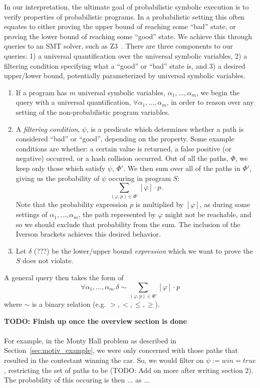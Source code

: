 \documentclass[acmsmall,review]{acmart}\settopmatter{}
\begin{document}
	
	In our interpretation, the ultimate goal of probabilistic symbolic execution is to verify properties of probabilistic programs.
	In a probabilistic setting this often equates to either proving the upper bound of reaching some ``bad'' state, or proving the lower bound of reaching some ``good'' state.
	We achieve this through queries to an SMT solver, such as Z3~\cite{demoura2008}.
	There are three components to our queries: 1) a universal quantification over the universal symbolic variables, 2) a filtering condition specifying what a ``good'' or ``bad'' state is, and 3) a desired upper/lower bound, potentially parameterized by universal symbolic variables.
	\begin{enumerate}
		\item If a program has $m$ universal symbolic variables, $\alpha_1,\ldots,\alpha_m$, we begin the query with a universal quantification, $\forall \alpha_1,\ldots,\alpha_m$, in order to reason over any setting of the non-probabilistic program variables.
		\item A \textit{filtering condition}, $\psi$, is a predicate which determines whether a path is considered ``bad'' or ``good'', depending on the property.
		Some example conditions are whether: a certain value is returned, a false positive (or negative) occurred, or a hash collision occurred.
		Out of all the paths, $\Phi$, we keep only those which satisfy $\psi$, $\Phi'$.
		We then sum over all of the paths in $\Phi'$, giving us the probability of $\psi$ occuring in program $S$:
		\[
		\sum_{(\varphi,p) \in \Phi'} [\varphi]\cdot p.
		\]
		Note that the probability expression $p$ is multiplied by $[\varphi]$, as during some settings of $\alpha_1,\ldots,\alpha_m$, the path represented by $\varphi$ might not be reachable, and so we should exclude that probability from the sum.
		The inclusion of the Iverson brackets achieves this desired behavior.
		\item Let $\delta$ (???) be the lower/upper bound \textit{expression} which we want to prove the $S$ does not violate.
	\end{enumerate}
	A general query then takes the form of
	\[
	\forall \alpha_1,\ldots,\alpha_m . \displaystyle \delta \sim \sum_{(\varphi,p) \in \Phi'} [\varphi]\cdot p 
	\]
	where $\sim$ is a binary relation (e.g. $>,<,\leq,\geq$).
	
	
	{\color{blue} \textbf{TODO: Finish up once the overview section is done}\\\\
		For example, in the Monty Hall problem as described in Section~\ref{sec:motiv_example}, we were only concerned with those paths that resulted in the contestant winning the car.
		So, we would filter on $\psi := win = true$, restricting the set of paths to be (TODO: Add on more after writing section 2).
		The probability of this occuring is then ... as ...
	}
	
\end{document}
